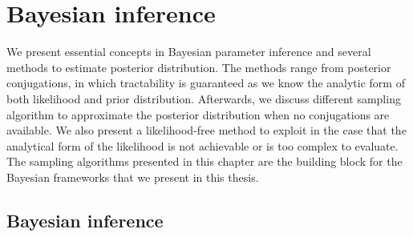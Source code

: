 \chapter{Bayesian inference}
We present essential concepts in Bayesian parameter inference and several methods to estimate
posterior distribution. The methods range from posterior conjugations, in which tractability is
guaranteed as we know the analytic form of both likelihood and prior distribution. Afterwards, we
discuss different sampling algorithm to approximate the posterior distribution when no conjugations
are available. We also present a likelihood-free method to exploit in the case that the analytical
form of the likelihood is not achievable or is too complex to evaluate. The sampling algorithms
presented in this chapter are the building block for the Bayesian frameworks that we present in this
thesis.

\section{Bayesian inference}
